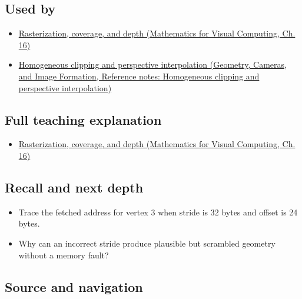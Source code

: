 \subsection{Used by}\label{appendix-749ba51a6c25-used-by}

\begin{itemize}
\tightlist
\item
  \href{../02-Mathematics-for-Visual-Computing/main.pdf\#nameddest=03-visual-computing-i-ch012-rasterization-coverage-and-depth}{Rasterization, coverage, and depth (Mathematics for Visual Computing, Ch. 16)}
\item
  \href{../03-Geometry-Cameras-and-Image-Formation/main.pdf\#nameddest=appendix-40426e4b2103}{Homogeneous clipping and perspective interpolation (Geometry, Cameras, and Image Formation, Reference notes: Homogeneous clipping and perspective interpolation)}
\end{itemize}

\subsection{Full teaching explanation}\label{appendix-749ba51a6c25-full-teaching-explanation}

\begin{itemize}
\tightlist
\item
  \href{../02-Mathematics-for-Visual-Computing/main.pdf\#nameddest=03-visual-computing-i-ch012-rasterization-coverage-and-depth}{Rasterization, coverage, and depth (Mathematics for Visual Computing, Ch. 16)}
\end{itemize}

\subsection{Recall and next depth}\label{appendix-749ba51a6c25-recall-and-next-depth}

\begin{itemize}
\tightlist
\item
  Trace the fetched address for vertex 3 when stride is 32 bytes and offset is 24 bytes.
\item
  Why can an incorrect stride produce plausible but scrambled geometry without a memory fault?
\end{itemize}

\subsection{Source and navigation}\label{appendix-749ba51a6c25-source-and-navigation}

